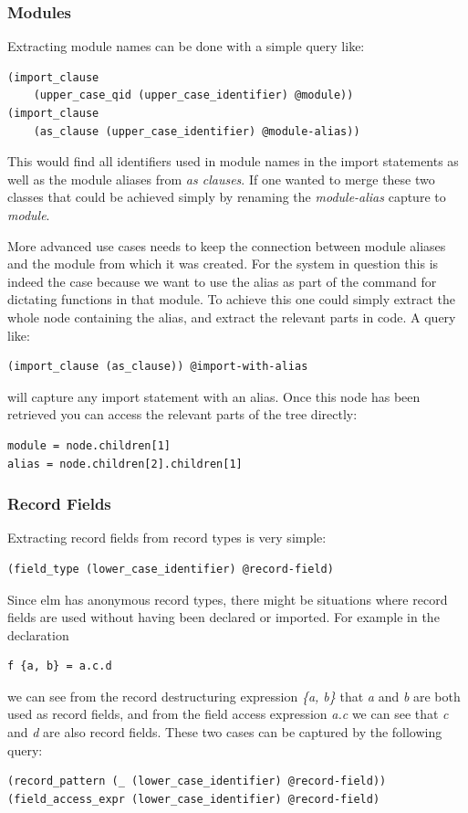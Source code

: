 \documentclass[../thesis.tex]{subfiles}
\begin{document}
\subsubsection{Modules}
Extracting module names can be done with a simple query like:
\begin{verbatim}
(import_clause 
    (upper_case_qid (upper_case_identifier) @module))
(import_clause 
    (as_clause (upper_case_identifier) @module-alias))
\end{verbatim}
This would find all identifiers used in module names in the import statements as well as the module aliases from \textit{as clauses}.
If one wanted to merge these two classes that could be achieved simply by renaming the \textit{module-alias} capture to \textit{module}.

More advanced use cases needs to keep the connection between module aliases and the module from which it was created.
For the system in question this is indeed the case because we want to use the alias as part of the command for dictating functions in that module.
To achieve this one could simply extract the whole node containing the alias, and extract the relevant parts in code.
A query like:
\begin{verbatim}
(import_clause (as_clause)) @import-with-alias
\end{verbatim}
will capture any import statement with an alias.
Once this node has been retrieved you can access the relevant parts of the tree directly:
\begin{verbatim}
module = node.children[1]
alias = node.children[2].children[1]
\end{verbatim}

\subsubsection{Record Fields}
Extracting record fields from record types is very simple:
\begin{verbatim}
(field_type (lower_case_identifier) @record-field)
\end{verbatim}
Since elm has anonymous record types, there might be situations where record fields are used
without having been declared or imported.
For example in the declaration
\begin{verbatim}
f {a, b} = a.c.d
\end{verbatim}
we can see from the record destructuring expression \textit{\{a, b\}} that \textit{a} and \textit{b} are both used as record fields,
and from the field access expression \textit{a.c} we can see that \textit{c} and \textit{d} are also record fields.
These two cases can be captured by the following query:
\begin{verbatim}
(record_pattern (_ (lower_case_identifier) @record-field))
(field_access_expr (lower_case_identifier) @record-field)
\end{verbatim}
\end{document}
